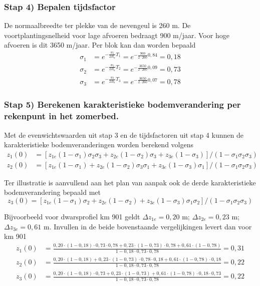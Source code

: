 \subsubsection*{Stap 4) Bepalen tijdsfactor}

De normaalbreedte ter plekke van de nevengeul is 260 m.
De voortplantingsnelheid voor lage afvoeren bedraagt 900 m/jaar.
Voor hoge afvoeren is dit 3650 m/jaar.
Per blok kan dan worden bepaald
%
\begin{align}
\sigma_1 &= e^{-\frac{w_l}{2B_n}T_1} = e^{-\frac{900}{2 \cdot 260} 0,84} = 0,18 \\
\sigma_2 &= e^{-\frac{w_l}{2B_n}T_2} = e^{-\frac{3650}{2 \cdot 260} 0,09} = 0,73 \\
\sigma_3 &= e^{-\frac{w_l}{2B_n}T_3} = e^{-\frac{3650}{2 \cdot 260} 0,07} = 0,78
\end{align}

\subsubsection*{Stap 5) Berekenen karakteristieke bodemverandering per rekenpunt in het zomerbed.}

Met de evenwichtswaarden uit stap 3 en de tijdsfactoren uit stap 4 kunnen de karakteristieke bodemveranderingen worden berekend volgens
%
\begin{align}
z_1(0) &= [z_{1e} (1-\sigma_1) \sigma_2 \sigma_3 + z_{2e} (1-\sigma_2) \sigma_3 + z_{3e} (1-\sigma_3)]/(1 - \sigma_1 \sigma_2 \sigma_3) \\
z_2(0) &= [z_{1e} (1-\sigma_1) + z_{2e} (1-\sigma_2) \sigma_3 \sigma_1 + z_{3e} (1-\sigma_3) \sigma_1]/(1 - \sigma_1 \sigma_2 \sigma_3)
\end{align}

Ter illustratie is aanvullend aan het plan van aanpak ook de derde karakteristieke bodemverandering bepaald met
%
\begin{equation}
z_3(0) = [z_{1e} (1-\sigma_1) \sigma_2 + z_{2e} (1-\sigma_2) + z_{3e} (1-\sigma_3) \sigma_1 \sigma_2]/(1 - \sigma_1 \sigma_2 \sigma_3)
\end{equation}

Bijvoorbeeld voor dwarsprofiel km 901 geldt $\Delta z_{1e}=0,20$ m; $\Delta z_{2e}=0,23$ m; $\Delta z_{3e}=0,61$ m.
Invullen in de beide bovenstaande vergelijkingen levert dan voor km 901
%
\begin{align}
z_1(0) &= \tfrac{0,20 \cdot (1-0,18) \cdot 0,73 \cdot 0,78 + 0,23 \cdot (1-0,73) \cdot 0,78 + 0,61 \cdot (1-0,78)}{1 - 0,18 \cdot 0,73 \cdot 0,78} = 0,31 \\
z_2(0) &= \tfrac{0,20 \cdot (1-0,18) + 0,23 \cdot (1-0,73) \cdot 0,78 \cdot 0,18 + 0,61 \cdot (1-0,78) \cdot 0,18}{1 - 0,18 \cdot 0,73 \cdot 0,78} = 0,22 \\
z_3(0) &= \tfrac{0,20 \cdot (1-0,18) \cdot 0,73 + 0,23 \cdot (1-0,73) + 0,61 \cdot (1-0,78) \cdot 0,18 \cdot 0,73}{1 - 0,18 \cdot 0,73 \cdot 0,78} = 0,22
\end{align}

